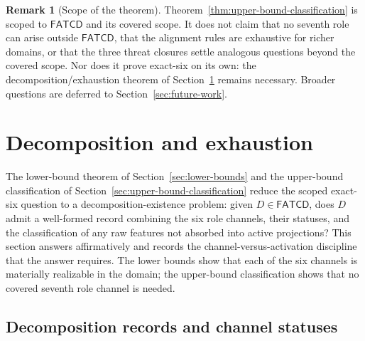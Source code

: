 \documentclass[11pt]{article}
\theoremstyle{definition}
\newtheorem{remark}[theorem]{Remark}
\newcommand{\FATCD}{\ensuremath{\mathsf{FATCD}}}
\begin{document}
\begin{remark}[Scope of the theorem]\label{rem:classification-scope}
Theorem~\ref{thm:upper-bound-classification} is scoped to \FATCD{}
and its covered scope. It does not claim that no seventh role can
arise outside \FATCD{}, that the alignment rules are exhaustive for
richer domains, or that the three threat closures settle analogous
questions beyond the covered scope. Nor does it prove exact-six on
its own: the decomposition/exhaustion theorem of
Section~\ref{sec:decomposition-exhaustion} remains necessary. Broader
questions are deferred to Section~\ref{sec:future-work}.
\end{remark}
 \section{Decomposition and exhaustion}\label{sec:decomposition-exhaustion}




The lower-bound theorem of Section~\ref{sec:lower-bounds} and the
upper-bound classification of
Section~\ref{sec:upper-bound-classification} reduce the scoped
exact-six question to a decomposition-existence problem: given
\(D \in \FATCD{}\), does \(D\) admit a well-formed record combining
the six role channels, their statuses, and the classification of any
raw features not absorbed into active projections? This section
answers affirmatively and records the channel-versus-activation
discipline that the answer requires. The lower bounds show that each
of the six channels is materially realizable in the domain; the
upper-bound classification shows that no covered seventh role channel
is needed.

\subsection{Decomposition records and channel statuses}\label{subsec:dec-records}
\end{document}
